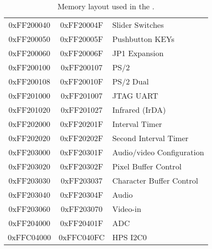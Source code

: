 \begin{table}[h]
\begin{center}
\begin{tabular}{c|c|l}
        \\
            0xFF200040
            & 0xFF20004F
            & Slider Switches
        \\
            0xFF200050
            & 0xFF20005F
            & Pushbutton KEYs
        \\
            0xFF200060
            & 0xFF20006F
            & JP1 Expansion
        \\
            0xFF200100
            & 0xFF200107
            & PS/2
        \\
            0xFF200108
            & 0xFF20010F
            & PS/2 Dual
        \\
            0xFF201000
            & 0xFF201007
            & JTAG UART
        \\
            0xFF201020
            & 0xFF201027
				& Infrared (IrDA)
        \\
            0xFF202000
            & 0xFF20201F
            & Interval Timer
        \\
            0xFF202020
            & 0xFF20202F
            & Second Interval Timer
        \\
            0xFF203000
            & 0xFF20301F
            & Audio/video Configuration
        \\
            0xFF203020
            & 0xFF20302F
            & Pixel Buffer Control
        \\
            0xFF203030
            & 0xFF203037
            & Character Buffer Control
        \\
            0xFF203040
            & 0xFF20304F
            & Audio
        \\
            0xFF203060
            & 0xFF203070
            & Video-in
        \\
            0xFF204000
            & 0xFF20401F
            & ADC
        \\
            0xFFC04000
            & 0xFFC040FC
            & HPS I2C0
        \\
    \end{tabular}
    \caption{Memory layout used in the \systemName.}
    \label{tab:memorylayout}
    \end{center}
\end{table}


\clearpage














